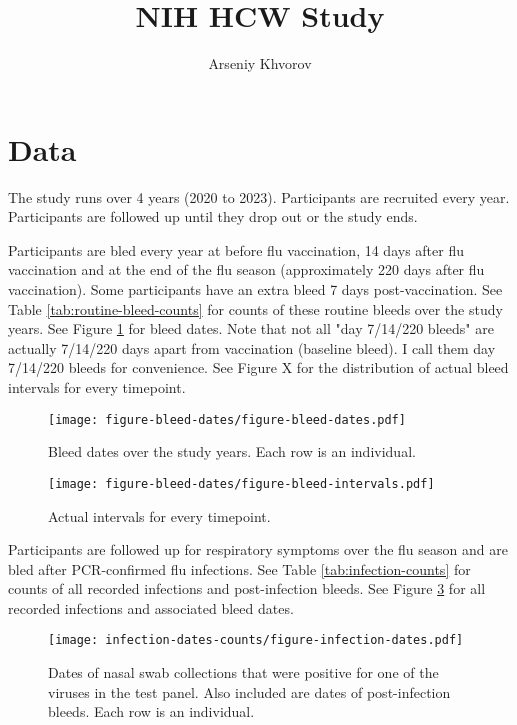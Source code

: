 \documentclass[12pt]{article}
\title{NIH HCW Study}
\author{Arseniy Khvorov}
\begin{document}
\maketitle

\section{Data}

The study runs over 4 years (2020 to 2023). 
Participants are recruited every year.
Participants are followed up until they drop out or the study ends.

Participants are bled every year at before flu vaccination, 14 days after flu vaccination and at the end of the flu season (approximately 220 days after flu vaccination). 
Some participants have an extra bleed 7 days post-vaccination.
See Table \ref{tab:routine-bleed-counts} for counts of these routine bleeds over the study years. 
See Figure \ref{fig:bleed-dates} for bleed dates.
Note that not all "day 7/14/220 bleeds" are actually 7/14/220 days apart from vaccination (baseline bleed).
I call them day 7/14/220 bleeds for convenience.
See Figure X for the distribution of actual bleed intervals for every timepoint.



\begin{figure}
	\texttt{[image: figure-bleed-dates/figure-bleed-dates.pdf]}
	\caption{Bleed dates over the study years. Each row is an individual.}
	\label{fig:bleed-dates}
\end{figure}

\begin{figure}
	\texttt{[image: figure-bleed-dates/figure-bleed-intervals.pdf]}
	\caption{Actual intervals for every timepoint.}
	\label{fig:bleed-intervals}
\end{figure}

Participants are followed up for respiratory symptoms over the flu season and are bled after PCR-confirmed flu infections.
See Table \ref{tab:infection-counts} for counts of all recorded infections and post-infection bleeds.
See Figure \ref{fig:postinf-bleed-dates} for all recorded infections and associated bleed dates.



\begin{figure}
	\texttt{[image: infection-dates-counts/figure-infection-dates.pdf]}
	\caption{Dates of nasal swab collections that were positive for one of the viruses in the test panel. Also included are dates of post-infection bleeds. Each row is an individual.}
	\label{fig:postinf-bleed-dates}
\end{figure}
\end{document}
